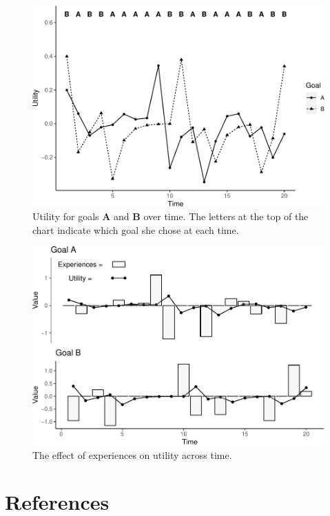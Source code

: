 \documentclass[english,man]{apa6}
\theoremstyle{definition}
\theoremstyle{definition}
\theoremstyle{definition}
\theoremstyle{remark}
\begin{document}
\begin{figure}
\centering
\includegraphics{figures/Figure1-1.pdf}
\caption{\label{fig:Figure1}Utility for goals \textbf{A} and \textbf{B} over
time. The letters at the top of the chart indicate which goal she chose
at each time.}
\end{figure}

\begin{figure}
\centering
\includegraphics{figures/Figure2-1.pdf}
\caption{\label{fig:Figure2}The effect of experiences on utility across
time.}
\end{figure}

\newpage

\section{References}\label{references}
\end{document}
